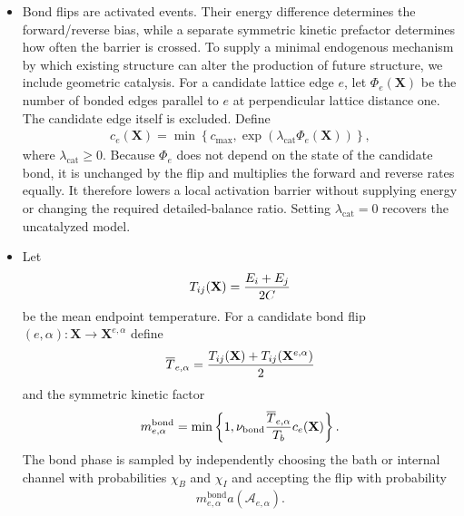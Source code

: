 \documentclass[12pt,letterpaper]{article}
\newcommand{\mb}{\mathbf}
\newcommand{\mc}{\mathcal}
\begin{document}
\begin{itemize}
\begin{align*}
E_{i}' = E_{i}-{\Delta U_{e}\over 2}, \qquad E_{j}' = E_{j}-{\Delta U_{e}\over 2}.
\end{align*}
The bath channel leaves both internal energies unchanged. Bond formation between particles in different molecules merges their components immediately, while a bond break is followed by a connected-component update that may split the original molecule.
\item Bond flips are activated events. Their energy difference determines the forward/reverse bias, while a separate symmetric kinetic prefactor determines how often the barrier is crossed. To supply a minimal endogenous mechanism by which existing structure can alter the production of future structure, we include geometric catalysis. For a candidate lattice edge $e$, let $\Phi_{e}(\mb{X})$ be the number of bonded edges parallel to $e$ at perpendicular lattice distance one. The candidate edge itself is excluded. Define
\begin{align*}
c_{e}(\mb{X}) = \min\left\{c_{\max},\exp(\lambda_{\mathrm{cat}}\Phi_{e}(\mb{X}))\right\},
\end{align*}
where $\lambda_{\mathrm{cat}}\geq 0$. Because $\Phi_{e}$ does not depend on the state of the candidate bond, it is unchanged by the flip and multiplies the forward and reverse rates equally. It therefore lowers a local activation barrier without supplying energy or changing the required detailed-balance ratio. Setting $\lambda_{\mathrm{cat}}=0$ recovers the uncatalyzed model.
\item Let
\begin{align*}
T_{ij}(\mb{X})={E_{i}+E_{j}\over 2C}
\end{align*}
be the mean endpoint temperature. For a candidate bond flip $(e,\alpha):\mb{X}\to\mb{X}^{e,\alpha}$ define
\begin{align*}
\overline{T}_{e,\alpha}={T_{ij}(\mb{X})+T_{ij}(\mb{X}^{e,\alpha})\over 2}
\end{align*}
and the symmetric kinetic factor
\begin{align*}
m_{e,\alpha}^{\mathrm{bond}}=\min\left\{1,\nu_{\mathrm{bond}}{\overline{T}_{e,\alpha}\over T_{b}}c_{e}(\mb{X})\right\}.
\end{align*}
The bond phase is sampled by independently choosing the bath or internal channel with probabilities $\chi_{B}$ and $\chi_{I}$ and accepting the flip with probability
\begin{align*}
m_{e,\alpha}^{\mathrm{bond}}a(\mc{A}_{e,\alpha}).

\end{align*}
\end{itemize}
\end{document}
